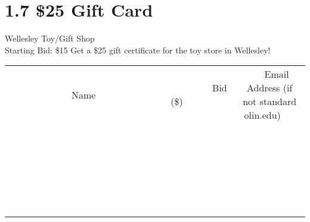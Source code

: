 \documentclass[11pt]{article}
\begin{document}
\section*{1.7 \$25 Gift Card}
Wellesley Toy/Gift Shop
\\
Starting Bid: \$15
\newline
Get a \$25 gift certificate for the toy store in Wellesley!
\\[6ex]
\begin{tabular}{c c c}
~~~~~~~~~~~~~Name~~~~~~~~~~~~~ & ~~~~~~~~~Bid (\$)~~~~~~~~~  & ~~~Email Address (if not standard olin.edu)~~~\\
 & & \\
\hline
 & & \\
\hline
 & & \\
\hline
 & & \\
\hline
 & & \\
\hline
 & & \\
\hline
 & & \\
\hline
 & & \\
\hline
 & & \\
\hline
 & & \\
\hline
 & & \\
\hline
 & & \\
\hline
 & & \\
\hline
 & & \\
\hline
 & & \\
\hline
 & & \\
\hline
 & & \\
\hline
 & & \\
\hline
 & & \\
\hline
 & & \\
\hline
 & & \\
\hline
 & & \\
\hline
 & & \\
\hline
 & & \\
\hline
 & & \\
\hline
 & & \\
\hline
\end{tabular}
\newpage
\end{document}
